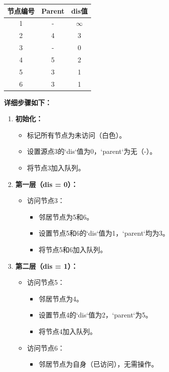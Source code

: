 \documentclass{article}
\begin{document}
\begin{center}
\begin{tabular}{|c|c|c|}
    \hline
    节点编号 & Parent & dis值 \\
    \hline
    1 & - & $\infty$ \\
    2 & 4 & 3 \\
    3 & - & 0 \\
    4 & 5 & 2 \\
    5 & 3 & 1 \\
    6 & 3 & 1 \\
    \hline
\end{tabular}
\end{center}

\noindent\textbf{详细步骤如下：}

\begin{enumerate}
    \item \textbf{初始化：}
    \begin{itemize}
        \item 标记所有节点为未访问（白色）。
        \item 设置源点3的`dis`值为0，`parent`为无（-）。
        \item 将节点3加入队列。
    \end{itemize}
    
    \item \textbf{第一层（dis = 0）：}
    \begin{itemize}
        \item 访问节点3：
        \begin{itemize}
            \item 邻居节点为5和6。
            \item 设置节点5和6的`dis`值为1，`parent`均为3。
            \item 将节点5和6加入队列。
        \end{itemize}
    \end{itemize}
    
    \item \textbf{第二层（dis = 1）：}
    \begin{itemize}
        \item 访问节点5：
        \begin{itemize}
            \item 邻居节点为4。
            \item 设置节点4的`dis`值为2，`parent`为5。
            \item 将节点4加入队列。
        \end{itemize}
        \item 访问节点6：
        \begin{itemize}
            \item 邻居节点为自身（已访问），无需操作。
        \end{itemize}
    \end{itemize}
    

\end{enumerate}
\end{document}

